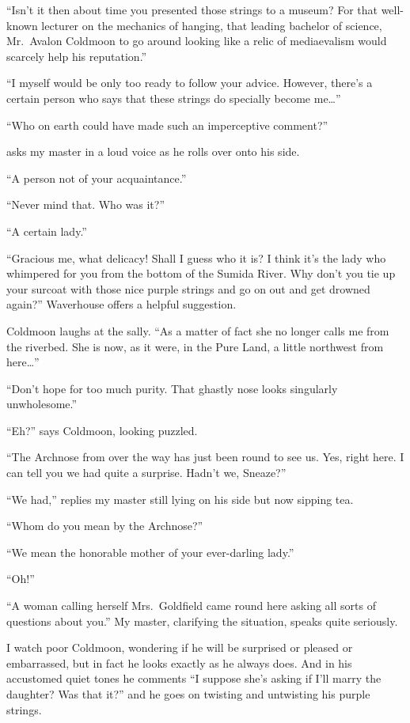 \documentclass[12pt, openright]{book}
\begin{document}
``Isn't it then about time you presented those strings to a museum? For
that well-known lecturer on the mechanics of hanging, that leading
bachelor of science, Mr.~Avalon Coldmoon to go around looking like a
relic of mediaevalism would scarcely help his reputation.''

``I myself would be only too ready to follow your advice. However,
there's a certain person who says that these strings do specially become
me\ldots{}''

``Who on earth could have made such an imperceptive comment?''

asks my master in a loud voice as he rolls over onto his side.

``A person not of your acquaintance.''

``Never mind that. Who was it?''

``A certain lady.''

``Gracious me, what delicacy! Shall I guess who it is? I think it's the
lady who whimpered for you from the bottom of the Sumida River. Why
don't you tie up your surcoat with those nice purple strings and go on
out and get drowned again?'' Waverhouse offers a helpful suggestion.

Coldmoon laughs at the sally. ``As a matter of fact she no longer calls
me from the riverbed. She is now, as it were, in the Pure Land, a little
northwest from here\ldots{}''

``Don't hope for too much purity. That ghastly nose looks singularly
unwholesome.''

``Eh?'' says Coldmoon, looking puzzled.

``The Archnose from over the way has just been round to see us. Yes,
right here. I can tell you we had quite a surprise. Hadn't we, Sneaze?''

``We had,'' replies my master still lying on his side but now sipping
tea.

``Whom do you mean by the Archnose?''

``We mean the honorable mother of your ever-darling lady.''

``Oh!''

``A woman calling herself Mrs.~Goldfield came round here asking all
sorts of questions about you.'' My master, clarifying the situation,
speaks quite seriously.

I watch poor Coldmoon, wondering if he will be surprised or pleased or
embarrassed, but in fact he looks exactly as he always does. And in his
accustomed quiet tones he comments ``I suppose she's asking if I'll
marry the daughter? Was that it?'' and he goes on twisting and
untwisting his purple strings.
\end{document}
